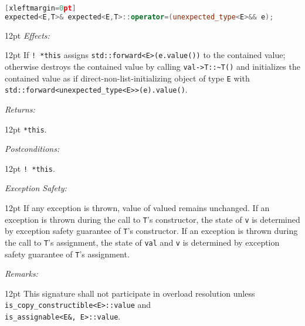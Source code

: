 \documentclass[a4paper,10pt]{article}
\newcommand{\cpp}[1]{\lstinline{#1}}
\newcommand{\wordingItem}[1]{\noindent\textit{#1:}}
\newenvironment{wordingTextItem}[1]{\wordingItem{#1}\vspace{2pt}\noindent\begin{adjustwidth}{12pt}{}}{\vspace{2pt}\end{adjustwidth}}
\newenvironment{wordingPara}{\begin{adjustwidth}{12pt}{}}{\end{adjustwidth}}
\begin{document}
\begin{lstlisting}[language=C++][xleftmargin=0pt]
expected<E,T>& expected<E,T>::operator=(unexpected_type<E>&& e); 
\end{lstlisting}
\begin{wordingPara}
\begin{wordingTextItem}{Effects}
If \cpp{! *this} assigns \cpp{std::forward<E>(e.value())} to the contained value; otherwise destroys the contained value by calling \cpp{val->T::~T()} and initializes the contained value as if direct-non-list-initializing object of type \cpp{E} with \cpp{std::forward<unexpected_type<E>>(e).value()}.
\end{wordingTextItem}
\begin{wordingTextItem}{Returns}
\cpp{*this}.
\end{wordingTextItem}
\begin{wordingTextItem}{Postconditions}
\cpp{! *this}.
\end{wordingTextItem}
\begin{wordingTextItem}{Exception Safety}
If any exception is thrown, value of valued remains unchanged. If an exception is thrown during the call to \cpp{T}'s constructor, the state of \cpp{v} is determined by exception safety guarantee of \cpp{T}'s constructor. If an exception is thrown during the call to \cpp{T}'s assignment, the state of \cpp{val} and \cpp{v} is determined by exception safety guarantee of \cpp{T}'s assignment.
\end{wordingTextItem}
\begin{wordingTextItem}{Remarks}
This signature shall not participate in overload resolution unless\\
\cpp{is_copy_constructible<E>::value} and \\
\cpp{is_assignable<E&, E>::value}.
\end{wordingTextItem}
\end{wordingPara}
\end{document}

